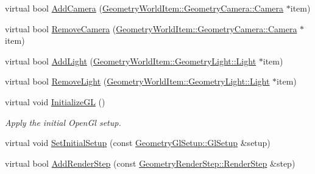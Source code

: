 \begin{DoxyCompactItemize}
\item 
virtual bool \mbox{\hyperlink{class_geometry_engine_1_1_geometry_scene_1_1_geometry_scene_af93678aaffba19dfb2302a9b2850ae59}{Add\+Camera}} (\mbox{\hyperlink{class_geometry_engine_1_1_geometry_world_item_1_1_geometry_camera_1_1_camera}{Geometry\+World\+Item\+::\+Geometry\+Camera\+::\+Camera}} $\ast$item)
\item 
virtual bool \mbox{\hyperlink{class_geometry_engine_1_1_geometry_scene_1_1_geometry_scene_ae5607835364c78780386efb5dbde3fff}{Remove\+Camera}} (\mbox{\hyperlink{class_geometry_engine_1_1_geometry_world_item_1_1_geometry_camera_1_1_camera}{Geometry\+World\+Item\+::\+Geometry\+Camera\+::\+Camera}} $\ast$item)
\item 
virtual bool \mbox{\hyperlink{class_geometry_engine_1_1_geometry_scene_1_1_geometry_scene_adde250133889e145473064d276e96583}{Add\+Light}} (\mbox{\hyperlink{class_geometry_engine_1_1_geometry_world_item_1_1_geometry_light_1_1_light}{Geometry\+World\+Item\+::\+Geometry\+Light\+::\+Light}} $\ast$item)
\item 
virtual bool \mbox{\hyperlink{class_geometry_engine_1_1_geometry_scene_1_1_geometry_scene_ab0217afe0c403087d3be028f012b1125}{Remove\+Light}} (\mbox{\hyperlink{class_geometry_engine_1_1_geometry_world_item_1_1_geometry_light_1_1_light}{Geometry\+World\+Item\+::\+Geometry\+Light\+::\+Light}} $\ast$item)
\item 
\mbox{\label{class_geometry_engine_1_1_geometry_scene_1_1_geometry_scene_a604e2c95f3b17ec14b637fb2829d23e0}} 
virtual void \mbox{\hyperlink{class_geometry_engine_1_1_geometry_scene_1_1_geometry_scene_a604e2c95f3b17ec14b637fb2829d23e0}{Initialize\+GL}} ()
\begin{DoxyCompactList}\small\item\em Apply the initial Open\+Gl setup. \end{DoxyCompactList}\item 
virtual void \mbox{\hyperlink{class_geometry_engine_1_1_geometry_scene_1_1_geometry_scene_aaef4d7c17ec0292604c3d0cbb861b980}{Set\+Initial\+Setup}} (const \mbox{\hyperlink{class_geometry_engine_1_1_geometry_gl_setup_1_1_gl_setup}{Geometry\+Gl\+Setup\+::\+Gl\+Setup}} \&setup)
\item 
virtual bool \mbox{\hyperlink{class_geometry_engine_1_1_geometry_scene_1_1_geometry_scene_ada6f2a88a6e7962200a12e5083f8c055}{Add\+Render\+Step}} (const \mbox{\hyperlink{class_geometry_engine_1_1_geometry_render_step_1_1_render_step}{Geometry\+Render\+Step\+::\+Render\+Step}} \&step)

\end{DoxyCompactItemize}
